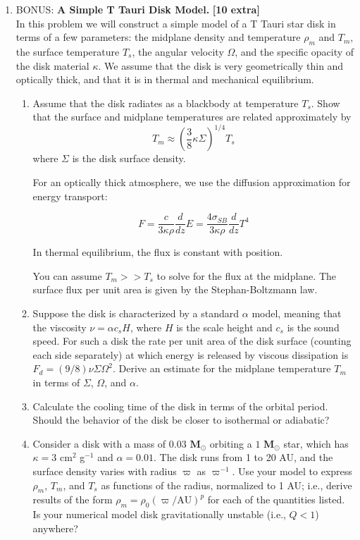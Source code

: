 \documentclass{article}
\newcommand{\msun}{\ensuremath{\textbf{M}_\odot}}
\begin{document}
\begin{enumerate}
\item BONUS: {\bf A Simple T Tauri Disk Model.} \textbf{[10 extra]}\\
In this problem we will construct a simple model of a T Tauri star disk in terms of a few parameters: the midplane density and temperature $\rho_m$ and $T_m$, the surface temperature $T_s$, the angular velocity $\Omega$, and the specific opacity of the disk material $\kappa$. We assume that the disk is very geometrically thin and optically thick, and that it is in thermal and mechanical equilibrium.
\begin{enumerate}
    \item

Assume that the disk radiates as a blackbody at temperature $T_s$. Show that the surface and midplane temperatures are related approximately by
$$
T_m \approx \left(\frac{3}{8}\kappa\Sigma\right)^{1/4} T_s
$$
where $\Sigma$ is the disk surface density.

For an optically thick atmosphere, we use the diffusion approximation for energy transport:

$$F = \frac{c}{3 \kappa \rho} \frac{d}{dz}{E} = \frac{4 \sigma_{SB}}{3\kappa \rho} \frac{d}{dz}T^4$$

In thermal equilibrium, the flux is constant with position.  

You can assume $T_m >> T_s$ to solve for the flux at the midplane.  The surface flux per unit area is given by the Stephan-Boltzmann law.

\item Suppose the disk is characterized by a standard $\alpha$ model, meaning that the viscosity $\nu=\alpha c_s H$, where $H$ is the scale height and $c_s$ is the sound speed. For such a disk the rate per unit area of the disk surface (counting each side separately) at which energy is released by viscous dissipation is $F_d=(9/8) \nu \Sigma \Omega^2$. Derive an estimate for the midplane temperature $T_m$ in terms of $\Sigma$, $\Omega$, and $\alpha$.
\item Calculate the cooling time of the disk in terms of the orbital period. Should the behavior of the disk be closer to isothermal or adiabatic?
\item Consider a disk with a mass of $0.03$ $\msun$ orbiting a $1$ $\msun$ star, which has $\kappa=3$ cm$^2$ g$^{-1}$ and $\alpha=0.01$. The disk runs from 1 to 20 AU, and the surface density varies with radius $\varpi$ as $\varpi^{-1}$. Use your model to express $\rho_m$, $T_m$, and $T_s$ as functions of the radius, normalized to 1 AU; i.e., derive results of the form $\rho_m = \rho_0 (\varpi/\mathrm{AU})^p$ for each of the quantities listed. Is your numerical model disk gravitationally unstable (i.e., $Q<1$) anywhere?
\end{enumerate}



\end{enumerate}
\end{document}
